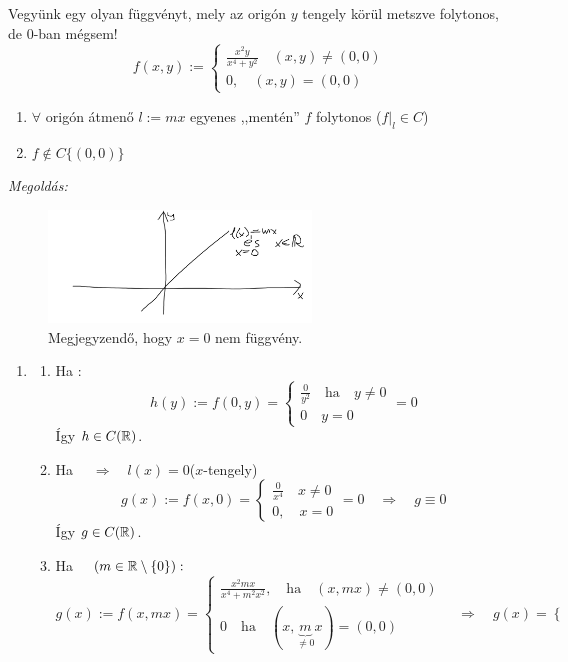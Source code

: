 \documentclass[a4paper,11.5pt]{article}
\begin{document}
	\begin{task}
		Vegyünk egy olyan függvényt, mely az origón $y$ tengely körül metszve folytonos, de 0-ban mégsem!
		\[ f(x,y):=\begin{cases}
			\frac{x^2y}{x^4+y^2}\quad (x,y)\not=(0,0)\\
			0,\quad (x,y)=(0,0)
		\end{cases} \]
		\begin{enumerate}
			\item $\forall$ origón átmenő $l:=mx$ egyenes ,,mentén'' $f$ folytonos ($f|_l\in C$)
			\item $f\notin C\{ (0,0) \}$
		\end{enumerate}
		\textit{Megoldás:}
		\begin{figure}[H]
			\centering
			\includegraphics[height=3cm]{../2zh/kepek/26.png}
			\caption{Megjegyzendő, hogy $x=0$ nem függvény.}
		\end{figure}
		\begin{enumerate}
			\item\begin{enumerate}
				\item Ha :
				\[ h(y):=f(0,y)=\begin{cases}
					\frac{0}{y^2}\quad \text{ha}\quad y\not=0\\
					0\quad y=0
				\end{cases}=0\] 
				Így $h\in C(\mathbb{R})$.
				\item Ha $\quad \Rightarrow\quad l(x)=0$\quad ($x$-tengely)
				\[ g(x):=f(x,0)=\begin{cases}
					\frac{0}{x^4}\quad x\not=0\\
					0,\quad x=0
				\end{cases}=0\quad\Rightarrow\quad  g\equiv0\]
				Így $g\in C(\mathbb{R})$.
				\item Ha $\quad (m\in\mathbb{R}\setminus\{0\}):$
				\[ g(x):=f(x,mx)=\begin{cases}
					\frac{x^2mx}{x^4+m^2x^2},\quad \text{ha}\quad (x,mx)\not=(0,0)\\
					0\quad \text{ha}\quad (x,\underbrace{m}_{\not=0}x)=(0,0)
				\end{cases}\quad  \Rightarrow\quad g(x)=\begin{cases}

\end{cases}\]
\end{enumerate}
\end{enumerate}
\end{task}
\end{document}
